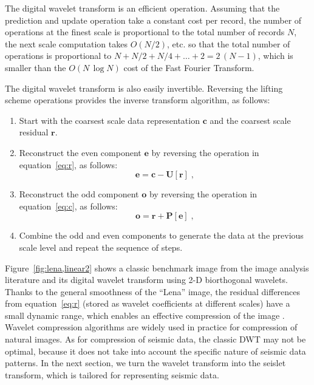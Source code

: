 The digital wavelet transform is an efficient operation. Assuming that
the prediction and update operation take a constant cost per record,
the number of operations at the finest scale is proportional to the
total number of records $N$, the next scale computation takes
$O(N/2)$, etc. so that the total number of operations is proportional
to $N+N/2+N/4+\ldots + 2 =2\,(N-1)$, which is smaller than the
$O(N\,\log{N})$ cost of the Fast Fourier Transform.

The digital wavelet transform is also easily invertible. Reversing the lifting 
scheme operations provides the inverse transform algorithm, as follows:
\begin{enumerate}
\item Start with the coarsest scale data representation $\mathbf{c}$
      and the coarsest scale residual $\mathbf{r}$.
\item Reconstruct the even component $\mathbf{e}$ by reversing the 
      operation in equation~\ref{eq:r}, as follows:
\begin{equation}
    \label{eq:e}
    \mathbf{e} = \mathbf{c} - \mathbf{U[r]}\;,
  \end{equation}
\item Reconstruct the odd component 
  $\mathbf{o}$ by reversing the operation in equation~\ref{eq:c}, as follows:
  \begin{equation}
    \label{eq:o}
    \mathbf{o} = \mathbf{r}  + \mathbf{P[e]}\;,
  \end{equation} 
\item Combine the odd and even components to generate the data at 
      the previous scale level and repeat the sequence of steps.
\end{enumerate}

Figure~\ref{fig:lena,linear2} shows a classic benchmark image from the
image analysis literature and its digital wavelet transform using 2-D
biorthogonal wavelets. Thanks to the general smoothness of the
``Lena'' image, the residual differences from equation~\ref{eq:r}
(stored as wavelet coefficients at different scales) have a small
dynamic range, which enables an effective compression of the
 image . Wavelet compression
algorithms are widely used in practice for compression of natural
images. As for compression of seismic data, the classic DWT may not be
optimal, because it does not take into account the specific nature of
seismic data patterns. In the next section, we turn the wavelet
transform into the seislet transform, which is tailored for
representing seismic data.

